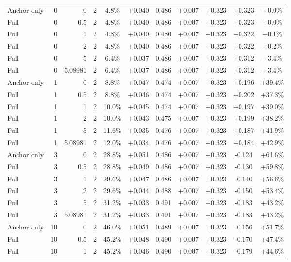 \begin{table}[htbp]
\begin{tabular}{lrrrccccccc}
Anchor only & 0 & 0 & 2 & 4.8\% & +0.040 & 0.486 & +0.007 & +0.323 & +0.323 & +0.0\% \\
Full & 0 & 0.5 & 2 & 4.8\% & +0.040 & 0.486 & +0.007 & +0.323 & +0.323 & +0.0\% \\
Full & 0 & 1 & 2 & 4.8\% & +0.040 & 0.486 & +0.007 & +0.323 & +0.322 & +0.1\% \\
Full & 0 & 2 & 2 & 4.8\% & +0.040 & 0.486 & +0.007 & +0.323 & +0.322 & +0.2\% \\
Full & 0 & 5 & 2 & 6.4\% & +0.037 & 0.486 & +0.007 & +0.323 & +0.312 & +3.4\% \\
Full & 0 & 5.08981 & 2 & 6.4\% & +0.037 & 0.486 & +0.007 & +0.323 & +0.312 & +3.4\% \\
Anchor only & 1 & 0 & 2 & 8.8\% & +0.047 & 0.474 & +0.007 & +0.323 & +0.196 & +39.4\% \\
Full & 1 & 0.5 & 2 & 8.8\% & +0.046 & 0.474 & +0.007 & +0.323 & +0.202 & +37.3\% \\
Full & 1 & 1 & 2 & 10.0\% & +0.045 & 0.474 & +0.007 & +0.323 & +0.197 & +39.0\% \\
Full & 1 & 2 & 2 & 10.0\% & +0.043 & 0.475 & +0.007 & +0.323 & +0.199 & +38.2\% \\
Full & 1 & 5 & 2 & 11.6\% & +0.035 & 0.476 & +0.007 & +0.323 & +0.187 & +41.9\% \\
Full & 1 & 5.08981 & 2 & 12.0\% & +0.034 & 0.476 & +0.007 & +0.323 & +0.184 & +42.9\% \\
Anchor only & 3 & 0 & 2 & 28.8\% & +0.051 & 0.486 & +0.007 & +0.323 & -0.124 & +61.6\% \\
Full & 3 & 0.5 & 2 & 28.8\% & +0.049 & 0.486 & +0.007 & +0.323 & -0.130 & +59.8\% \\
Full & 3 & 1 & 2 & 29.6\% & +0.047 & 0.486 & +0.007 & +0.323 & -0.140 & +56.6\% \\
Full & 3 & 2 & 2 & 29.6\% & +0.044 & 0.488 & +0.007 & +0.323 & -0.150 & +53.4\% \\
Full & 3 & 5 & 2 & 31.2\% & +0.033 & 0.491 & +0.007 & +0.323 & -0.183 & +43.2\% \\
Full & 3 & 5.08981 & 2 & 31.2\% & +0.033 & 0.491 & +0.007 & +0.323 & -0.183 & +43.2\% \\
Anchor only & 10 & 0 & 2 & 46.0\% & +0.051 & 0.489 & +0.007 & +0.323 & -0.156 & +51.7\% \\
Full & 10 & 0.5 & 2 & 45.2\% & +0.048 & 0.490 & +0.007 & +0.323 & -0.170 & +47.4\% \\
Full & 10 & 1 & 2 & 45.2\% & +0.046 & 0.490 & +0.007 & +0.323 & -0.179 & +44.6\% \\

\end{tabular}
\end{table}
